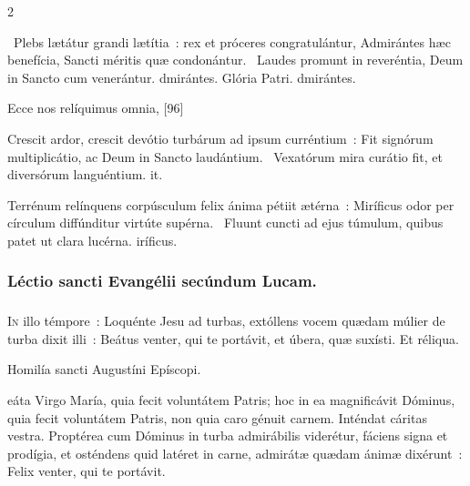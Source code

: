 \documentclass[9pt,twoside]{extarticle}
\begin{document}
\begin{multicols}{2}
\begin{tightlist}{}
\item {}~Plebs lætátur grandi lætítia~: rex et próceres congratulántur, \textred{*} Admirántes hæc benefícia, Sancti méritis quæ condonántur.
~Laudes promunt in reveréntia, Deum in Sancto cum venerántur. dmirántes. Glória Patri. dmirántes.
\item {} Ecce nos relíquimus omnia,  [96]
\item {} Crescit ardor, crescit devótio turbárum ad ipsum curréntium~: \textred{*} Fit signórum multiplicátio, ac Deum in Sancto laudántium.
~Vexatórum mira curátio fit, et diversórum languéntium. it.
\item {} Terrénum relínquens corpúsculum felix ánima pétiit ætérna~: \textred{*} Miríficus odor per círculum diffúnditur virtúte supérna.
~Fluunt cuncti ad ejus túmulum, quibus patet ut clara lucérna. iríficus.
\item {}
\end{tightlist}

\subsubsection*{\center Léctio sancti Evangélii secúndum Lucam.}
\subsubsection*{\center {}}
\lettrine{I}n illo témpore~: Loquénte Jesu ad turbas, extóllens vocem quædam múlier de turba dixit illi~: Beátus venter, qui te portávit, et úbera, quæ suxísti. Et réliqua.

\begin{center}Homilía sancti Augustíni Epíscopi.\\
\end{center}
eáta Virgo María, quia fecit voluntátem Patris; hoc in ea magnificávit Dóminus, quia fecit voluntátem Patris, non quia caro génuit carnem. Inténdat cáritas vestra. Proptérea cum Dóminus in turba admirábilis viderétur, fáciens signa et prodígia, et osténdens quid latéret in carne, admirátæ quædam ánimæ dixérunt~: Felix venter, qui te portávit.


\end{multicols}
\end{document}
